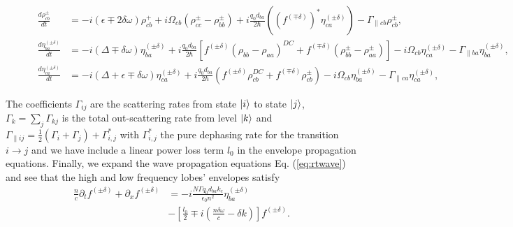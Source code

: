 \documentclass[journal]{IEEEtran}
\begin{document}
\begin{figure}[!t]
\begin{subequations}
\begin{align}
	\frac{d \rho_{cb}^{\pm}}{d t}  &= -i(\epsilon \mp 2\delta\omega)\rho_{cb}^{+} +i \Omega_{cb}(\rho_{cc}^{\pm} - \rho_{bb}^{\pm}) +i\frac{q_0d_{ba}}{2 \hbar}( (f^{(\mp\delta)})^*\eta_{ca}^{(\pm\delta)} )- \Gamma_{\parallel cb} \rho_{cb}^{\pm},\\
	\frac{d \eta_{ba}^{(\pm\delta)}}{d t} &= -i(\Delta \mp \delta\omega)\eta_{ba}^{(\pm\delta)}
	+i\frac{q_0d_{ba}}{2\hbar} \left[ f^{(\pm\delta)}(\rho_{bb}-\rho_{aa})^{DC} + f^{(\mp \delta)} (\rho_{bb}^{\pm}-\rho_{aa}^{\pm})\right]-i\Omega_{cb}\eta_{ca}^{(\pm\delta)}- \Gamma_{\parallel ba}\eta_{ba}^{(\pm\delta)}, \label{eq:eta_cb-temphole} \\
	\frac{d \eta_{ca}^{(\pm\delta)}}{d t} &= -i(\Delta+\epsilon \mp \delta\omega)\eta_{ca}^{(\pm\delta)}+i\frac{q_0d_{ba}}{2\hbar} ( f^{(\pm\delta)}\rho_{cb}^{DC} + f^{(\mp \delta)} \rho_{cb}^{\pm})-i\Omega_{cb}\eta_{ba}^{(\pm\delta)}-
	\Gamma_{\parallel ca}\eta_{ca}^{(\pm\delta)}, \label{eq:eta_ca-temphole}
	\end{align} 
	\end{subequations}
	\hrulefill
	\vspace*{4pt}
\end{figure}

The coefficients $\Gamma_{ij} $ are the scattering rates from state $\ket{i}$ to state $\ket{j}$, $\Gamma_k = \sum_{j}\Gamma_{kj}$ is the total out-scattering rate from level $\ket{k}$ and $\Gamma_{\parallel ij} = \frac{1}{2}(\Gamma_{i} + \Gamma_j) + \Gamma_{i,j}^*$ with $\Gamma_{i,j}^*$ the pure dephasing rate for the transition $i\rightarrow j$ and we have include a linear power loss term $l_0$ in the envelope propagation equations. 
Finally, we expand the wave propagation equations Eq. (\ref{eq:rtwave}) and see that the high and low frequency lobes' envelopes satisfy
\begin{align}
\frac{n}{c}\partial_t f^{(\pm \delta)} + \partial_{x}f^{(\pm \delta)}&= -i\frac{N \Gamma q_0d_{ba} k_c}{\epsilon_0 n^2} \eta_{ba}^{(\pm \delta)}  \nonumber \\ 
&-\left[\frac{l_0}{2}  \mp i (\frac{n\delta\omega}{c}-\delta k)\right] f^{(\pm \delta)}\label{eq:rtwave-temphole}.
\end{align}




\end{document}
